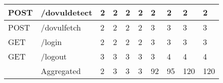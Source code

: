 \begin{table*}[]
\begin{tabular}{|l|l|l|l|l|l|l|l|l|l|}
  POST                                  & /dovuldetect                       & 2                                          & 2                                          & 2                                          & 2                                          & 2                                          & 2                                          & 2                                          & 2                                           \\ \hline
  POST                                  & /dovulfetch                        & 2                                          & 2                                          & 2                                          & 2                                          & 3                                          & 3                                          & 3                                          & 3                                           \\ \hline
  GET                                   & /login                             & 2                                          & 2                                          & 2                                          & 2                                          & 3                                          & 3                                          & 3                                          & 3                                           \\ \hline
  GET                                   & /logout                            & 3                                          & 3                                          & 3                                          & 3                                          & 3                                          & 4                                          & 4                                          & 4                                           \\ \hline
                                        & Aggregated                         & 2                                          & 3                                          & 3                                          & 3                                          & 92                                         & 95                                         & 120                                        & 120                                         \\ \hline
  \end{tabular}
  \end{table*}